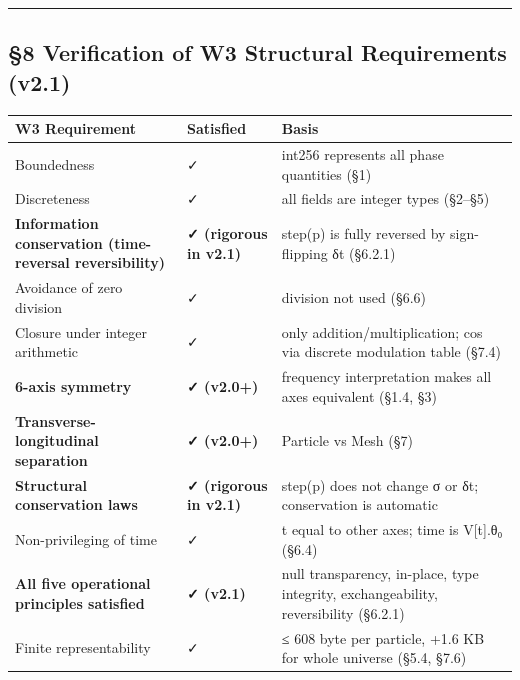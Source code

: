 \documentclass[a4paper,11pt]{article}
\newcounter{none}
\begin{document}
\begin{center}\rule{0.5\linewidth}{0.5pt}\end{center}

\subsection{§8 Verification of W3 Structural Requirements
(v2.1)}\label{verification-of-w3-structural-requirements-v2.1}

{\def\LTcaptype{none} %
\begin{longtable}[]{@{}
  >{\raggedright\arraybackslash}p{}
  >{\raggedright\arraybackslash}p{}
  >{\raggedright\arraybackslash}p{}@{}}
\toprule\noalign{}
\begin{minipage}[b]{\linewidth}\raggedright
W3 Requirement
\end{minipage} & \begin{minipage}[b]{\linewidth}\raggedright
Satisfied
\end{minipage} & \begin{minipage}[b]{\linewidth}\raggedright
Basis
\end{minipage} \\
\midrule\noalign{}
\endhead
\bottomrule\noalign{}
\endlastfoot
Boundedness & ✓ & int256 represents all phase quantities (§1) \\
Discreteness & ✓ & all fields are integer types (§2--§5) \\
\textbf{Information conservation (time-reversal reversibility)} &
\textbf{✓ (rigorous in v2.1)} & step(p) is fully reversed by
sign-flipping δt (§6.2.1) \\
Avoidance of zero division & ✓ & division not used (§6.6) \\
Closure under integer arithmetic & ✓ & only addition/multiplication; cos
via discrete modulation table (§7.4) \\
\textbf{6-axis symmetry} & \textbf{✓ (v2.0+)} & frequency interpretation
makes all axes equivalent (§1.4, §3) \\
\textbf{Transverse-longitudinal separation} & \textbf{✓ (v2.0+)} &
Particle vs Mesh (§7) \\
\textbf{Structural conservation laws} & \textbf{✓ (rigorous in v2.1)} &
step(p) does not change σ or δt; conservation is automatic \\
Non-privileging of time & ✓ & t equal to other axes; time is V{[}t{]}.θ₀
(§6.4) \\
\textbf{All five operational principles satisfied} & \textbf{✓ (v2.1)} &
null transparency, in-place, type integrity, exchangeability,
reversibility (§6.2.1) \\
Finite representability & ✓ & ≤ 608 byte per particle, +1.6 KB for whole
universe (§5.4, §7.6) \\
\end{longtable}
}
\end{document}

